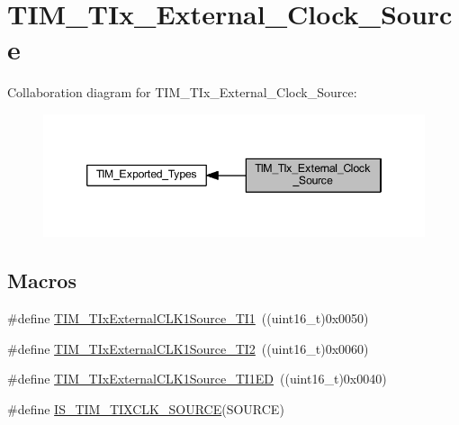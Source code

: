 \hypertarget{group___t_i_m___t_ix___external___clock___source}{}\section{T\+I\+M\+\_\+\+T\+Ix\+\_\+\+External\+\_\+\+Clock\+\_\+\+Source}
\label{group___t_i_m___t_ix___external___clock___source}
Collaboration diagram for T\+I\+M\+\_\+\+T\+Ix\+\_\+\+External\+\_\+\+Clock\+\_\+\+Source\+:
\nopagebreak
\begin{figure}[H]
\begin{center}
\leavevmode
\includegraphics[width=346pt]{group___t_i_m___t_ix___external___clock___source}
\end{center}
\end{figure}
\subsection*{Macros}
\begin{DoxyCompactItemize}
\item 
\#define \hyperlink{group___t_i_m___t_ix___external___clock___source_ga237daecde6e1f75509acc80a9ccce820}{T\+I\+M\+\_\+\+T\+Ix\+External\+C\+L\+K1\+Source\+\_\+\+T\+I1}~((uint16\+\_\+t)0x0050)
\item 
\#define \hyperlink{group___t_i_m___t_ix___external___clock___source_gafa3c6345a7e1c3668b2e7e4d61a79491}{T\+I\+M\+\_\+\+T\+Ix\+External\+C\+L\+K1\+Source\+\_\+\+T\+I2}~((uint16\+\_\+t)0x0060)
\item 
\#define \hyperlink{group___t_i_m___t_ix___external___clock___source_gaa1a749bc38d434902b69a45d50ee0889}{T\+I\+M\+\_\+\+T\+Ix\+External\+C\+L\+K1\+Source\+\_\+\+T\+I1\+ED}~((uint16\+\_\+t)0x0040)
\item 
\#define \hyperlink{group___t_i_m___t_ix___external___clock___source_gabfa9cd6cf6e9df4bff8d6cdf16c6b374}{I\+S\+\_\+\+T\+I\+M\+\_\+\+T\+I\+X\+C\+L\+K\+\_\+\+S\+O\+U\+R\+CE}(S\+O\+U\+R\+CE)
\end{DoxyCompactItemize}


